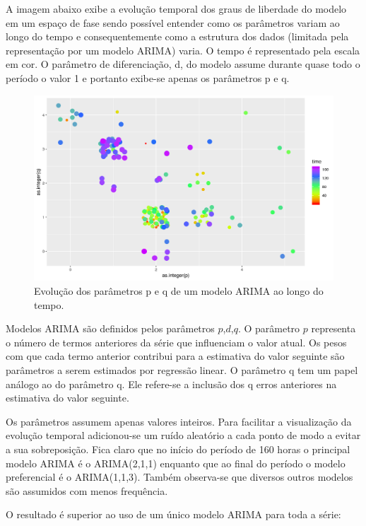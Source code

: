 \documentclass[
	12pt,				%
	openright,			%
	oneside,			%
	a4paper,			%
	english,			%
	french,				%
	spanish,			%
	brazil				%
	]{abntex2}
\begin{document}
A imagem abaixo exibe a evolução temporal dos graus de liberdade do modelo em um espaço de fase sendo possível entender como os parâmetros variam ao longo do tempo e consequentemente como a estrutura dos dados (limitada pela representação por um modelo ARIMA) varia. O tempo é representado pela escala em cor. O parâmetro de diferenciação, d, do modelo assume durante quase todo o período o valor 1 e portanto exibe-se apenas os parâmetros p e q.

\begin{figure}[h]
    \centering
	\includegraphics[width=\textwidth]{var_arima}
	\caption{Evolução dos parâmetros p e q de um modelo ARIMA ao longo do tempo.}
\end{figure}
\FloatBarrier

Modelos ARIMA são definidos pelos parâmetros $p$,$d$,$q$. O parâmetro $p$ representa o número de termos anteriores da série que influenciam o valor atual. Os pesos com que cada termo anterior contribui para a estimativa do valor seguinte são parâmetros a serem estimados por regressão linear.
O parâmetro q tem um papel análogo ao do parâmetro q. Ele refere-se a inclusão dos q erros anteriores na estimativa do valor seguinte.

Os parâmetros assumem apenas valores inteiros. Para facilitar a visualização da evolução temporal adicionou-se um ruído aleatório a cada ponto de modo a evitar a sua sobreposição. Fica claro que no início do período de 160 horas o principal modelo ARIMA é o ARIMA(2,1,1) enquanto que ao final do período o modelo preferencial é o ARIMA(1,1,3). Também observa-se que diversos outros modelos são assumidos com menos frequência.

O resultado é superior ao uso de um único modelo ARIMA para toda a série:
\end{document}
